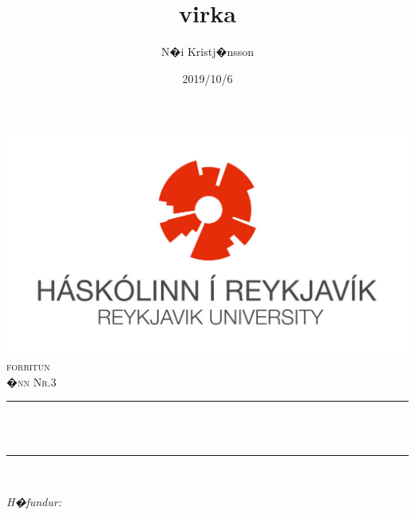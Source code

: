\documentclass[12pt]{article}
\title{virka}
\author{N�i Kristj�nsson}
\date{2019/10/6}
\makeatletter
\let\thetitle\@title
\let\theauthor\@author
\let\thedate\@date
\makeatother
\begin{document}

    \begin{titlepage}
        \centering
        \vspace*{0.5 cm}
        \includegraphics[scale = 1.15]{HR_logo_midjad_hires.jpg}\\[1.0 cm]	%
        \textsc{\Large forritun}\\[0.5 cm]				%
        \textsc{\large �nn Nr.3}\\[0.5 cm]				%
        \rule{\linewidth}{0.2 mm} \\[0.4 cm]
        { \huge \bfseries \thetitle}\\
        \rule{\linewidth}{0.2 mm} \\[1.5 cm]
        
        \begin{minipage}{0.4\textwidth}
            \begin{flushleft} \large
                \emph{H�fundur:}\\
                \theauthor
                \end{flushleft}
                \end{minipage}~
                \begin{minipage}{0.4\textwidth}
                \begin{flushright} \large
            \end{flushright}
        \end{minipage}\\[2 cm]
        
        {\large \thedate}\\[2 cm]
    
        \vfill
        
    \end{titlepage}


    
\end{document}
